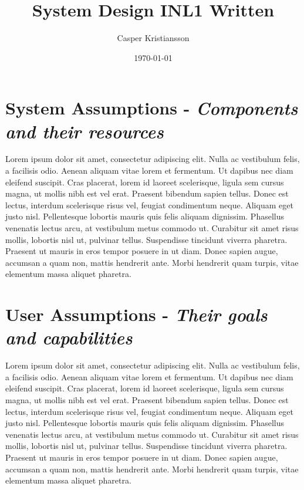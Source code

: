 \documentclass[9pt]{extarticle}
\title{System Design INL1 Written}
\author{Casper Kristiansson}
\date{\today}
\begin{document}
\maketitle

\section{System Assumptions - \textit{Components and their resources}}
 Lorem ipsum dolor sit amet, consectetur adipiscing elit. Nulla ac vestibulum felis, a facilisis odio. Aenean aliquam vitae lorem et fermentum. Ut dapibus nec diam eleifend suscipit. Cras placerat, lorem id laoreet scelerisque, ligula sem cursus magna, ut mollis nibh est vel erat. Praesent bibendum sapien tellus. Donec est lectus, interdum scelerisque risus vel, feugiat condimentum neque. Aliquam eget justo nisl. Pellentesque lobortis mauris quis felis aliquam dignissim. Phasellus venenatis lectus arcu, at vestibulum metus commodo ut. Curabitur sit amet risus mollis, lobortis nisl ut, pulvinar tellus. Suspendisse tincidunt viverra pharetra. Praesent ut mauris in eros tempor posuere in ut diam. Donec sapien augue, accumsan a quam non, mattis hendrerit ante. Morbi hendrerit quam turpis, vitae elementum massa aliquet pharetra.

\section{User Assumptions - \textit{Their goals and capabilities}}
 Lorem ipsum dolor sit amet, consectetur adipiscing elit. Nulla ac vestibulum felis, a facilisis odio. Aenean aliquam vitae lorem et fermentum. Ut dapibus nec diam eleifend suscipit. Cras placerat, lorem id laoreet scelerisque, ligula sem cursus magna, ut mollis nibh est vel erat. Praesent bibendum sapien tellus. Donec est lectus, interdum scelerisque risus vel, feugiat condimentum neque. Aliquam eget justo nisl. Pellentesque lobortis mauris quis felis aliquam dignissim. Phasellus venenatis lectus arcu, at vestibulum metus commodo ut. Curabitur sit amet risus mollis, lobortis nisl ut, pulvinar tellus. Suspendisse tincidunt viverra pharetra. Praesent ut mauris in eros tempor posuere in ut diam. Donec sapien augue, accumsan a quam non, mattis hendrerit ante. Morbi hendrerit quam turpis, vitae elementum massa aliquet pharetra.
\end{document}
